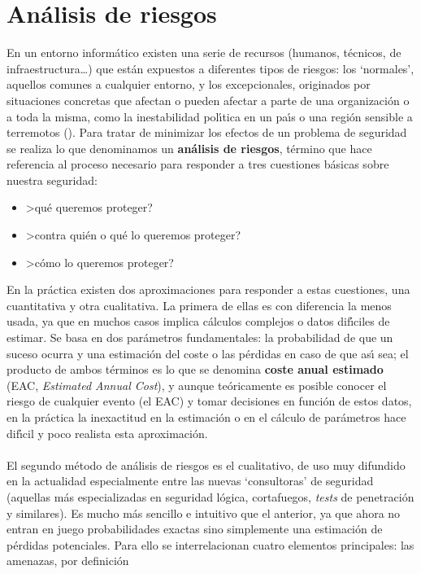 \section{An\'alisis de riesgos}
En un entorno inform\'atico existen una serie de recursos (humanos, t\'ecnicos,
de infraestructura\ldots) que est\'an expuestos a diferentes tipos de riesgos:
los `normales', aquellos comunes a cualquier entorno, y los excepcionales,
originados por situaciones concretas que afectan o pueden afectar a parte de una
organizaci\'on o a toda la misma, como la inestabilidad pol\'{\i}tica en un
pa\'{\i}s o una regi\'on sensible a terremotos (\cite{kn:pla83}). Para tratar
de minimizar los efectos de un problema de seguridad se realiza lo que 
denominamos un {\bf an\'alisis de riesgos}, t\'ermino que hace referencia al 
proceso necesario para responder a tres cuestiones b\'asicas sobre nuestra 
seguridad:
\begin{itemize}
\item >qu\'e queremos proteger?
\item >contra qui\'en o qu\'e lo queremos proteger? 
\item >c\'omo lo queremos proteger?
\end{itemize}
En la pr\'actica existen dos aproximaciones para responder a estas cuestiones,
una cuantitativa y otra cualitativa. La primera de ellas es con diferencia la 
menos usada, ya que en muchos casos implica c\'alculos complejos o datos 
dif\'{\i}ciles de estimar. Se basa en dos par\'ametros fundamentales: la
probabilidad de que un suceso ocurra y una estimaci\'on del coste o las 
p\'erdidas en caso de que as\'{\i} sea; el producto de ambos t\'erminos es lo
que se denomina {\bf coste anual estimado} (EAC, {\it Estimated Annual Cost}),
y aunque te\'oricamente es posible conocer el riesgo de cualquier evento (el 
EAC) y tomar decisiones en funci\'on de estos datos, en la pr\'actica la 
inexactitud en la estimaci\'on o en el c\'alculo de par\'ametros hace 
dif\'{\i}cil y poco realista esta aproximaci\'on.\\
\\El segundo m\'etodo de an\'alisis de riesgos es el cualitativo, de uso muy
difundido en la actualidad especialmente entre las nuevas `consultoras' de
seguridad (aquellas m\'as especializadas en seguridad l\'ogica, cortafuegos,
{\it tests} de penetraci\'on y similares). Es mucho m\'as sencillo e intuitivo
que el anterior, ya que ahora no entran en juego probabilidades exactas sino
simplemente una estimaci\'on de p\'erdidas potenciales. Para ello se 
interrelacionan cuatro elementos principales: las amenazas, por definici\'on 
